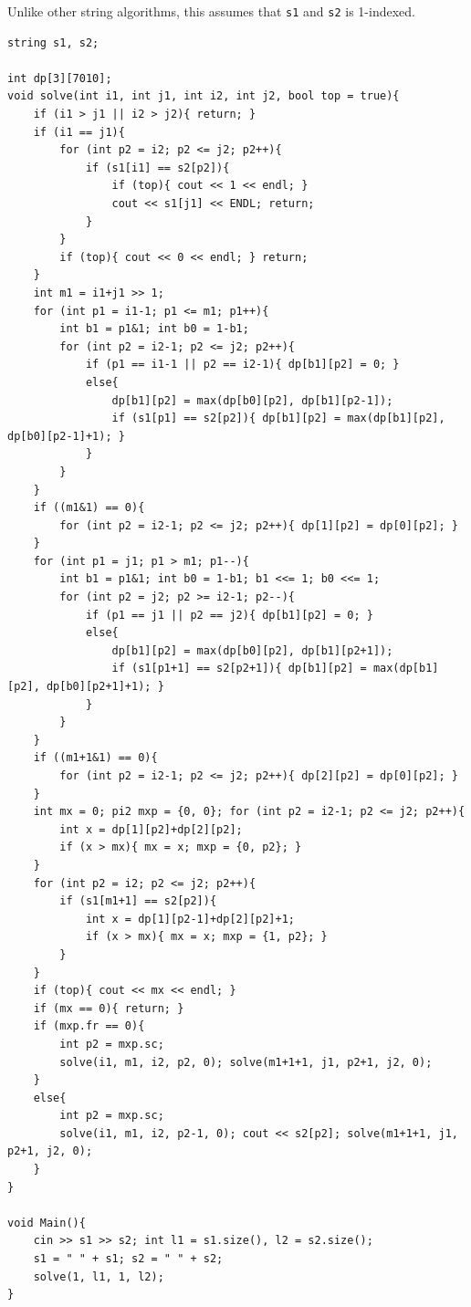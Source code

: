 Unlike other string algorithms, this assumes that \texttt{s1} and \texttt{s2} is 1-indexed.
\begin{verbatim}
string s1, s2;

int dp[3][7010];
void solve(int i1, int j1, int i2, int j2, bool top = true){
	if (i1 > j1 || i2 > j2){ return; }
	if (i1 == j1){
		for (int p2 = i2; p2 <= j2; p2++){
			if (s1[i1] == s2[p2]){
				if (top){ cout << 1 << endl; }
				cout << s1[j1] << ENDL; return;
			}
		}
		if (top){ cout << 0 << endl; } return;
	}
	int m1 = i1+j1 >> 1;
	for (int p1 = i1-1; p1 <= m1; p1++){
		int b1 = p1&1; int b0 = 1-b1;
		for (int p2 = i2-1; p2 <= j2; p2++){
			if (p1 == i1-1 || p2 == i2-1){ dp[b1][p2] = 0; }
			else{
				dp[b1][p2] = max(dp[b0][p2], dp[b1][p2-1]);
				if (s1[p1] == s2[p2]){ dp[b1][p2] = max(dp[b1][p2], dp[b0][p2-1]+1); }
			}
		}
	}
	if ((m1&1) == 0){
		for (int p2 = i2-1; p2 <= j2; p2++){ dp[1][p2] = dp[0][p2]; }
	}
	for (int p1 = j1; p1 > m1; p1--){
		int b1 = p1&1; int b0 = 1-b1; b1 <<= 1; b0 <<= 1;
		for (int p2 = j2; p2 >= i2-1; p2--){
			if (p1 == j1 || p2 == j2){ dp[b1][p2] = 0; }
			else{
				dp[b1][p2] = max(dp[b0][p2], dp[b1][p2+1]);
				if (s1[p1+1] == s2[p2+1]){ dp[b1][p2] = max(dp[b1][p2], dp[b0][p2+1]+1); }
			}
		}
	}
	if ((m1+1&1) == 0){
		for (int p2 = i2-1; p2 <= j2; p2++){ dp[2][p2] = dp[0][p2]; }
	}
	int mx = 0; pi2 mxp = {0, 0}; for (int p2 = i2-1; p2 <= j2; p2++){
		int x = dp[1][p2]+dp[2][p2];
		if (x > mx){ mx = x; mxp = {0, p2}; }
	}
	for (int p2 = i2; p2 <= j2; p2++){
		if (s1[m1+1] == s2[p2]){
			int x = dp[1][p2-1]+dp[2][p2]+1;
			if (x > mx){ mx = x; mxp = {1, p2}; }
		}
	}
	if (top){ cout << mx << endl; }
	if (mx == 0){ return; }
	if (mxp.fr == 0){
		int p2 = mxp.sc;
		solve(i1, m1, i2, p2, 0); solve(m1+1+1, j1, p2+1, j2, 0);
	}
	else{
		int p2 = mxp.sc;
		solve(i1, m1, i2, p2-1, 0); cout << s2[p2]; solve(m1+1+1, j1, p2+1, j2, 0);
	}
}

void Main(){
	cin >> s1 >> s2; int l1 = s1.size(), l2 = s2.size();
	s1 = " " + s1; s2 = " " + s2;
	solve(1, l1, 1, l2);
}
\end{verbatim}